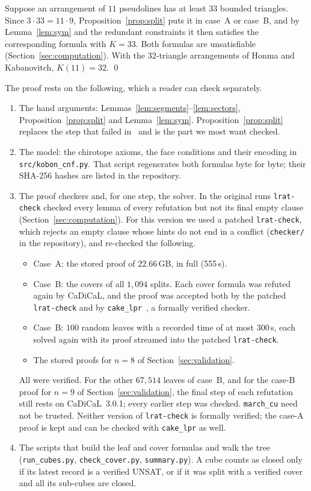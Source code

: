 \documentclass[11pt]{article}
\theoremstyle{definition}
\theoremstyle{remark}
\begin{document}
Suppose an arrangement of $11$ pseudolines has at least $33$ bounded triangles. Since
$3 \cdot 33 = 11 \cdot 9$, Proposition~\ref{prop:split} puts it in case~A or case~B, and by
Lemma~\ref{lem:sym} and the redundant constraints it then satisfies the corresponding formula with
$K = 33$. Both formulas are unsatisfiable (Section~\ref{sec:computation}). With the $32$-triangle
arrangements of Honma and Kabanovitch, $K(11) = 32$. \qed

\smallskip
The proof rests on the following, which a reader can check separately.
\begin{enumerate}
\item The hand arguments: Lemmas~\ref{lem:segments}--\ref{lem:sectors}, Proposition~\ref{prop:split}
  and Lemma~\ref{lem:sym}. Proposition~\ref{prop:split} replaces the step that failed in~\cite{cb}
  and is the part we most want checked.
\item The model: the chirotope axioms, the face conditions and their encoding in
  \texttt{src/kobon\_cnf.py}. That script regenerates both formulas byte for byte; their SHA-256
  hashes are listed in the repository.
\item The proof checkers and, for one step, the solver. In the original runs
  \texttt{lrat-check} checked every lemma of every refutation but not its final empty clause
  (Section~\ref{sec:computation}). For this version we used a patched \texttt{lrat-check}, which
  rejects an empty clause whose hints do not end in a conflict (\texttt{checker/} in the
  repository), and re-checked the following.
  \begin{itemize}
  \item Case~A: the stored proof of $22.66$\,GB, in full (555\,s).
  \item Case~B: the covers of all $1{,}094$ splits. Each cover formula was refuted again by
    CaDiCaL, and the proof was accepted both by the patched \texttt{lrat-check} and by
    \texttt{cake\_lpr}~\cite{cakelpr}, a formally verified checker.
  \item Case~B: $100$ random leaves with a recorded time of at most $300$\,s, each solved again
    with its proof streamed into the patched \texttt{lrat-check}.
  \item The stored proofs for $n = 8$ of Section~\ref{sec:validation}.
  \end{itemize}
  All were verified. For the other $67{,}514$ leaves of case~B, and for the case-B proof for
  $n = 9$ of Section~\ref{sec:validation}, the final step of each refutation still rests on
  CaDiCaL~3.0.1; every earlier step was checked. \texttt{march\_cu} need not be trusted.
  Neither version of \texttt{lrat-check} is formally verified; the case-A proof is kept and can
  be checked with \texttt{cake\_lpr} as well.
\item The scripts that build the leaf and cover formulas and walk the tree
  (\texttt{run\_cubes.py}, \texttt{check\_cover.py}, \texttt{summary.py}). A cube counts as closed
  only if its latest record is a verified UNSAT, or if it was split with a verified cover and all
  its sub-cubes are closed.
\end{enumerate}
\end{document}
